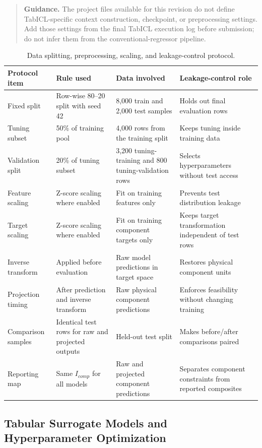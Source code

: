 \documentclass[a4paper,fleqn]{cas-sc}
\newcommand{\draftguidance}[1]{%
\begin{quote}
\small
\textbf{Guidance.} #1
\end{quote}
}
\begin{document}
\draftguidance{The project files available for this revision do not define TabICL-specific context construction, checkpoint, or preprocessing settings. Add those settings from the final TabICL execution log before submission; do not infer them from the conventional-regressor pipeline.}

\begin{table}[htbp]
\centering
\caption{Data splitting, preprocessing, scaling, and leakage-control protocol.}
\label{tab:data_protocol}
\scriptsize
\setlength{\tabcolsep}{3pt}
\begin{tabular}{p{2.8cm}p{3.0cm}p{3.0cm}p{3.0cm}}
\hline
Protocol item & Rule used & Data involved & Leakage-control role \\
\hline
Fixed split & Row-wise 80--20 split with seed 42 & 8,000 train and 2,000 test samples & Holds out final evaluation rows \\
Tuning subset & 50\% of training pool & 4,000 rows from the training split & Keeps tuning inside training data \\
Validation split & 20\% of tuning subset & 3,200 tuning-training and 800 tuning-validation rows & Selects hyperparameters without test access \\
Feature scaling & Z-score scaling where enabled & Fit on training features only & Prevents test distribution leakage \\
Target scaling & Z-score scaling where enabled & Fit on training component targets only & Keeps target transformation independent of test rows \\
Inverse transform & Applied before evaluation & Raw model predictions in target space & Restores physical component units \\
Projection timing & After prediction and inverse transform & Raw physical component predictions & Enforces feasibility without changing training \\
Comparison samples & Identical test rows for raw and projected outputs & Held-out test split & Makes before/after comparisons paired \\
Reporting map & Same $I_{comp}$ for all models & Raw and projected component predictions & Separates component constraints from reported composites \\
\hline
\end{tabular}
\end{table}

\subsection{Tabular Surrogate Models and Hyperparameter Optimization}
\end{document}

